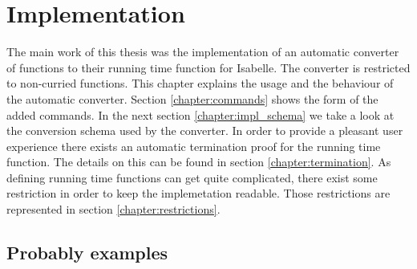 
\chapter{Implementation}\label{chapter:impl}

The main work of this thesis was the implementation of an automatic converter of functions to their running time function for Isabelle.
The converter is restricted to non-curried functions.
This chapter explains the usage and the behaviour of the automatic converter.
Section \ref{chapter:commands} shows the form of the added commands.
In the next section \ref{chapter:impl_schema} we take a look at the conversion schema used by the converter.
In order to provide a pleasant user experience there exists an automatic termination proof for the running time function.
The details on this can be found in section \ref{chapter:termination}.
As defining running time functions can get quite complicated, there exist some restriction in order to keep the implemetation readable.
Those restrictions are represented in section \ref{chapter:restrictions}.






\section{Probably examples}
